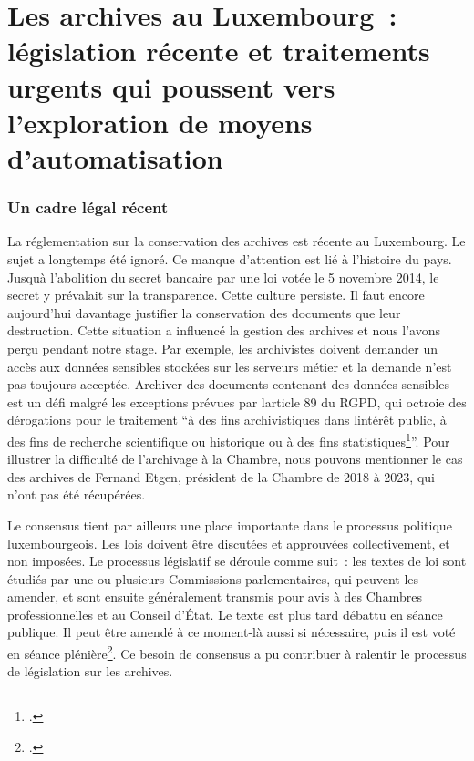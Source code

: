 \chapter{Les archives au Luxembourg~: législation récente et traitements urgents qui poussent vers l’exploration de moyens d’automatisation}

\subsection{Un cadre légal récent}


La réglementation sur la conservation des archives est récente au
Luxembourg. Le sujet a longtemps été ignoré. Ce manque d'attention est lié à
l'histoire du pays. Jusqu\textquotesingle à
l'abolition du secret bancaire par une loi votée le 5 novembre 2014, le
secret y prévalait sur la transparence. Cette culture persiste. Il faut
encore aujourd'hui davantage justifier la conservation des documents que
leur destruction. Cette situation a influencé la gestion des archives
et nous l'avons perçu pendant notre stage. Par exemple, les archivistes
doivent demander un accès aux données sensibles stockées sur les
serveurs métier et la demande n'est pas toujours acceptée.
Archiver des documents contenant des données sensibles est un défi
malgré les exceptions prévues par l\textquotesingle article 89 du RGPD,
qui octroie des dérogations pour le traitement \enquote{à des fins
archivistiques dans l\textquotesingle intérêt public, à des fins de
recherche scientifique ou historique ou à des fins
statistiques\footcite{EuropeanParliament2016a}}. Pour illustrer la difficulté de l'archivage à la Chambre, 
nous pouvons mentionner le cas des archives de Fernand Etgen,
président de la Chambre de 2018 à 2023, qui n'ont pas été récupérées. 

Le consensus tient par ailleurs une place importante dans
le processus politique luxembourgeois. Les lois doivent être discutées et approuvées
collectivement, et non imposées. Le processus législatif se
déroule comme suit~: les textes de loi sont étudiés par une ou plusieurs
Commissions parlementaires, qui peuvent les amender, et sont ensuite
généralement transmis pour avis à des Chambres professionnelles et au
Conseil d'État. Le texte est plus tard débattu en séance publique. Il peut
être amendé à ce moment-là aussi si nécessaire, puis il est voté en
séance plénière\footcite{noauthor_chambre_2024}. Ce besoin de consensus a pu contribuer à
ralentir le processus de législation sur les archives.
\newline

